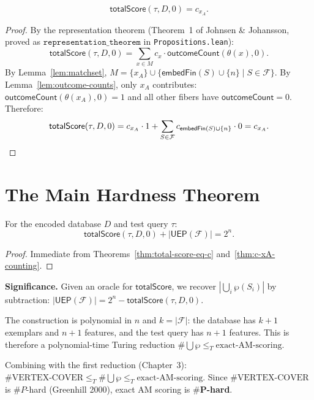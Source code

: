 \begin{theorem}
  \label{thm:total-score-eq-c}
  \leanok
  \[
    \mathsf{totalScore}(\tau, D, 0) = c_{x_A}.
  \]

  \begin{proof}
    By the representation theorem (Theorem~1 of Johnsen \& Johansson, proved as
    $\mathtt{representation\_theorem}$ in \texttt{Propositions.lean}):
    \[
      \mathsf{totalScore}(\tau, D, 0)
      = \sum_{x \in M} c_x \cdot \mathsf{outcomeCount}(\theta(x), 0).
    \]
    By Lemma~\ref{lem:matchset}, $M = \{x_A\} \cup \{\mathsf{embedFin}(S) \cup
    \{n\} \mid S \in \mathcal{F}\}$.  By Lemma~\ref{lem:outcome-counts}, only
    $x_A$ contributes: $\mathsf{outcomeCount}(\theta(x_A), 0) = 1$ and all other
    fibers have $\mathsf{outcomeCount} = 0$.  Therefore:
    \[
      \mathsf{totalScore}(\tau, D, 0)
      = c_{x_A} \cdot 1 + \sum_{S \in \mathcal{F}} c_{\mathsf{embedFin}(S)\cup\{n\}}
        \cdot 0
      = c_{x_A}. \qedhere
    \]
  \end{proof}
\end{theorem}

\section{The Main Hardness Theorem}

\begin{theorem}
  \label{thm:am-hard}
  \leanok
  For the encoded database $D$ and test query $\tau$:
  \[
    \mathsf{totalScore}(\tau, D, 0) + |\mathsf{UEP}(\mathcal{F})| = 2^n.
  \]

  \begin{proof}
    Immediate from Theorems~\ref{thm:total-score-eq-c}
    and~\ref{thm:c-xA-counting}.
  \end{proof}

  \textbf{Significance.}  Given an oracle for $\mathsf{totalScore}$, we recover
  $|\bigcup_i \wp(S_i)|$ by subtraction: $|\mathsf{UEP}(\mathcal{F})| = 2^n -
  \mathsf{totalScore}(\tau, D, 0)$.

  The construction is polynomial in $n$ and $k = |\mathcal{F}|$: the database
  has $k+1$ exemplars and $n+1$ features, and the test query has $n+1$ features.
  This is therefore a polynomial-time Turing reduction $\#\bigcup\wp \leq_T
  \text{exact-AM-scoring}$.

  Combining with the first reduction (Chapter~3): $\#\text{VERTEX-COVER}
  \leq_T \#\bigcup\wp \leq_T \text{exact-AM-scoring}$.  Since
  $\#\text{VERTEX-COVER}$ is $\#P$-hard (Greenhill 2000), exact AM scoring
  is $\mathbf{\#P}$\textbf{-hard}.
\end{theorem}

